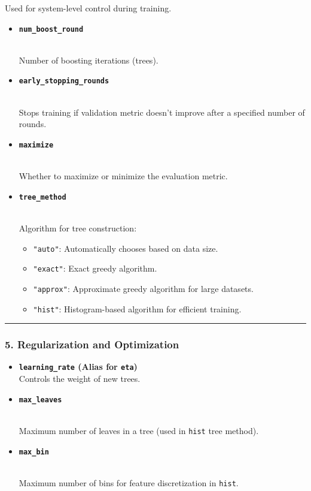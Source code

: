 \documentclass[12pt]{book}
\providecommand{\tightlist}{%
  \setlength{\itemsep}{0pt}\setlength{\parskip}{0pt}}
\begin{document}
Used for system-level control during training.

\begin{itemize}
\item
  \textbf{\texttt{num\_boost\_round}}\strut \\
  Number of boosting iterations (trees).
\item
  \textbf{\texttt{early\_stopping\_rounds}}\strut \\
  Stops training if validation metric doesn't improve after a specified
  number of rounds.
\item
  \textbf{\texttt{maximize}}\strut \\
  Whether to maximize or minimize the evaluation metric.
\item
  \textbf{\texttt{tree\_method}}\strut \\
  Algorithm for tree construction:

  \begin{itemize}
  \tightlist
  \item
    \texttt{"auto"}: Automatically chooses based on data size.
  \item
    \texttt{"exact"}: Exact greedy algorithm.
  \item
    \texttt{"approx"}: Approximate greedy algorithm for large datasets.
  \item
    \texttt{"hist"}: Histogram-based algorithm for efficient training.
  \end{itemize}
\end{itemize}

\begin{center}\rule{0.5\linewidth}{0.5pt}\end{center}

\subsubsection{\texorpdfstring{\textbf{5. Regularization and
Optimization}}{5. Regularization and Optimization}}\label{regularization-and-optimization}

\begin{itemize}
\item
  \textbf{\texttt{learning\_rate} (Alias for \texttt{eta})}\\
  Controls the weight of new trees.
\item
  \textbf{\texttt{max\_leaves}}\strut \\
  Maximum number of leaves in a tree (used in \texttt{hist} tree
  method).
\item
  \textbf{\texttt{max\_bin}}\strut \\
  Maximum number of bins for feature discretization in \texttt{hist}.
\end{itemize}
\end{document}
